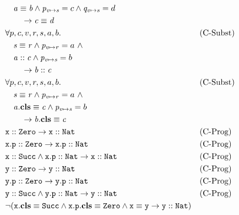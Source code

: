 \documentclass[a4paper]{article}
\begin{document}
\begin{align}
  &\quad \mathit{a} \equiv \mathit{b} \land
         \mathit{p}_{\mathit{v} \mapsto \mathit{s}}=c \land \mathit{q}_{\mathit{v} \mapsto \mathit{s}}=d\\
  &\qquad \rightarrow \mathit{c} \equiv \mathit{d}\\
  &\forall p, c, v, r, s, a, b. && \text{(C-Subst)}\\
  &\quad \mathit{s} \equiv \mathit{r} \land \mathit{p}_{\mathit{v} \mapsto \mathit{r}}=a~\land\\
  &\quad \mathit{a} :: \mathit{c} \land
         \mathit{p}_{\mathit{v} \mapsto \mathit{s}}=b\\
  &\qquad \rightarrow \mathit{b} :: \mathit{c}\\
  &\forall p, c, v, r, s, a, b. && \text{(C-Subst)}\\
  &\quad \mathit{s} \equiv \mathit{r} \land \mathit{p}_{\mathit{v} \mapsto \mathit{r}}=a~\land\\
  &\quad \mathit{a}.\textbf{cls} \equiv \mathit{c} \land
         \mathit{p}_{\mathit{v} \mapsto \mathit{s}}=b\\
  &\qquad \rightarrow \mathit{b}.\textbf{cls} \equiv \mathit{c}\\
  &\mathit{\mathtt{x}} :: \mathit{\mathtt{Zero}} \rightarrow \mathit{\mathtt{x}} :: \mathit{\mathtt{Nat}} && \text{(C-Prog)}\\
  &\mathit{\mathtt{x.p}} :: \mathit{\mathtt{Zero}} \rightarrow \mathit{\mathtt{x.p}} :: \mathit{\mathtt{Nat}} && \text{(C-Prog)}\\
  &\mathit{\mathtt{x}} :: \mathit{\mathtt{Succ}} \land \mathit{\mathtt{x.p}} :: \mathit{\mathtt{Nat}} \rightarrow \mathit{\mathtt{x}} :: \mathit{\mathtt{Nat}} && \text{(C-Prog)}\\
  &\mathit{\mathtt{y}} :: \mathit{\mathtt{Zero}} \rightarrow \mathit{\mathtt{y}} :: \mathit{\mathtt{Nat}} && \text{(C-Prog)}\\
  &\mathit{\mathtt{y.p}} :: \mathit{\mathtt{Zero}} \rightarrow \mathit{\mathtt{y.p}} :: \mathit{\mathtt{Nat}} && \text{(C-Prog)}\\
  &\mathit{\mathtt{y}} :: \mathit{\mathtt{Succ}} \land \mathit{\mathtt{y.p}} :: \mathit{\mathtt{Nat}} \rightarrow \mathit{\mathtt{y}} :: \mathit{\mathtt{Nat}} && \text{(C-Prog)}\\
  &\neg (\mathit{\mathtt{x}}.\textbf{cls} \equiv \mathit{\mathtt{Succ}} \land \mathit{\mathtt{x.p}}.\textbf{cls} \equiv \mathit{\mathtt{Zero}} \land \mathit{\mathtt{x}} \equiv \mathit{\mathtt{y}} \rightarrow \mathit{\mathtt{y}} :: \mathit{\mathtt{Nat}})
\end{align}
\newpage
\end{document}
